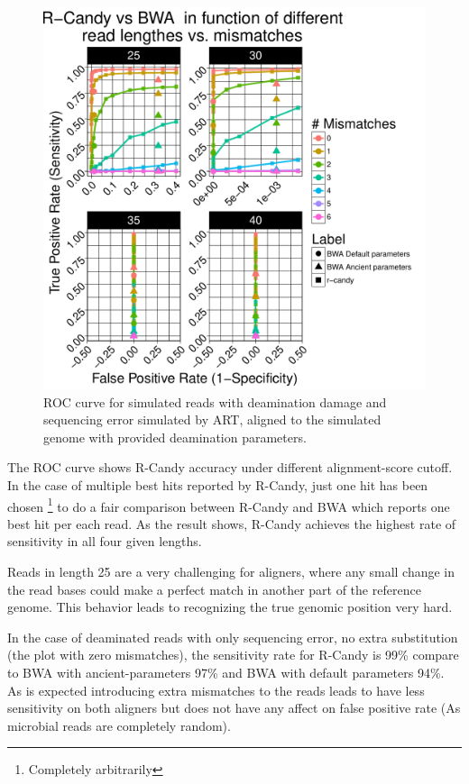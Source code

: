 \documentclass[11pt,a4paper]{report}
\begin{document}
\begin{figure}[H]
\centering
\includegraphics[width=12cm]{pictures/bROC_DS1_ART.pdf}
\caption{ROC curve for simulated reads with deamination damage and sequencing 
error simulated by ART, aligned to the simulated genome with provided 
deamination parameters.}
\label{DS1}
\end{figure}


The ROC curve shows R-Candy accuracy under different alignment-score cutoff.
In the case of multiple best hits reported by R-Candy, just one hit has been 
chosen \footnote{Completely arbitrarily} to do a fair comparison 
between R-Candy and BWA which reports one best hit per each read.
As the result shows, R-Candy achieves the highest rate of sensitivity
in all four given lengths.

Reads in length 25 are a very challenging for aligners, where any small change 
in the read bases could make a perfect match in another part of the reference 
genome. This behavior leads to recognizing the true genomic position very hard. 

In the case of deaminated reads with only sequencing error, no extra substitution 
(the plot with zero mismatches), the sensitivity rate for R-Candy is 99\% compare 
to BWA with ancient-parameters 97\% and BWA with default parameters 94\%. 
As is expected introducing extra mismatches to the reads leads to have less 
sensitivity on both aligners but does not have any affect on false positive rate
(As microbial reads are completely random).
\end{document}

